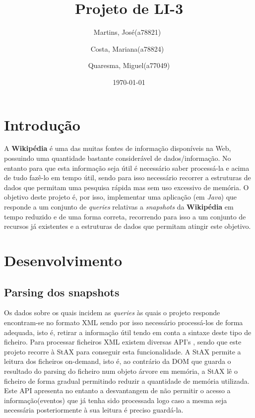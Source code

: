 \documentclass[a4paper,11pt]{article}
\title{Projeto de LI-3}
\author{Martins, José(a78821)\
        \and
        Costa, Mariana(a78824)\
        \and
        Quaresma, Miguel(a77049)
        }
\date{\today}
\begin{document}
\begin{titlepage}
\maketitle
\end{titlepage}

\tableofcontents
\newpage

\section{Introdução}
A \textbf{Wikipédia} é uma  das muitas fontes de informação disponíveis na Web, possuindo uma quantidade bastante considerável de dados/informação.
No entanto para que esta informação seja útil é necessário saber processá-la e acima de tudo fazê-lo em tempo útil, sendo para isso necessário recorrer a estruturas de dados que permitam uma pesquisa rápida mas sem uso excessivo de memória. O objetivo deste projeto é, por isso, implementar uma aplicação (em \textit{Java}) que responde a um conjunto de \textit{queries} relativas a \textit{snapshots} da \textbf{Wikipédia} em tempo reduzido e de uma forma correta, recorrendo para isso a um conjunto de recursos já existentes e a estruturas de dados que permitam atingir este objetivo.

\newpage

\section{Desenvolvimento}

\subsection{Parsing dos snapshots}
Os dados sobre os quais incidem as \textit{queries} às quais o projeto responde encontram-se no formato XML sendo por isso necessário processá-los de forma adequada, isto é, retirar a informação útil tendo em conta a sintaxe deste tipo de ficheiro. Para processar ficheiros XML existem diversas API's , sendo que este projeto recorre à StAX para conseguir esta funcionalidade. A StAX permite a leitura dos ficheiros on-demand, isto é, ao contrário da DOM que guarda o resultado do parsing do ficheiro num objeto árvore em memória, a StAX lê o ficheiro de forma gradual permitindo reduzir a quantidade de memória utilizada. Este API apresenta no entanto a desvantangem de não permitir o acesso a informação(eventos) que já tenha sido processada logo caso a mesma seja necessária posteriormente à sua leitura é preciso guardá-la.
\end{document}

